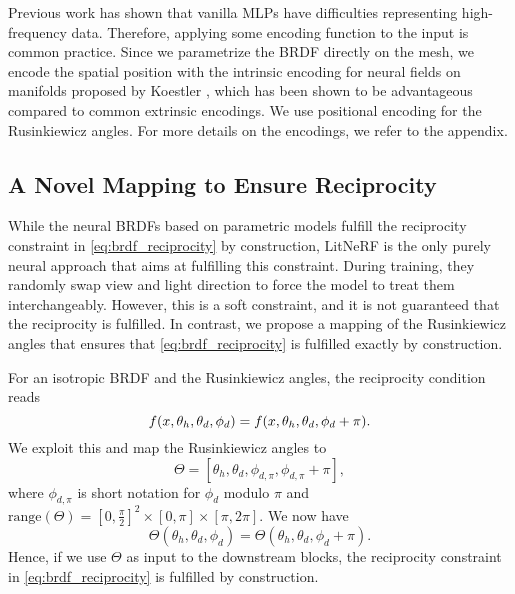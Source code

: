 Previous work has shown that vanilla MLPs have difficulties representing high-frequency data. Therefore, applying some encoding function to the input is common practice.
Since we parametrize the BRDF directly on the mesh, we encode the spatial position with the intrinsic encoding for neural fields on manifolds proposed by Koestler \etal \cite{KoestlerIntrinsicNeuralFields22}, which has been shown to be advantageous compared to common extrinsic encodings. We use positional encoding \cite{Mildenhall20Nerf} for the Rusinkiewicz angles. For more details on the encodings, we refer to the appendix.


\subsection{A Novel Mapping to Ensure Reciprocity}
\label{sec:reciMapping}
While the neural BRDFs based on parametric models fulfill the reciprocity constraint in \cref{eq:brdf_reciprocity} by construction, LitNeRF \cite{Sarkar23LitNerf} is the only purely neural approach that aims at fulfilling this constraint. During training, they randomly swap view and light direction to force the model to treat them interchangeably. However, this is a soft constraint, and it is not guaranteed that the reciprocity is fulfilled.
In contrast, we propose a mapping of the Rusinkiewicz angles that ensures that 
\cref{eq:brdf_reciprocity}
is fulfilled exactly by construction.

For an isotropic BRDF and the Rusinkiewicz angles, the reciprocity condition reads
\begin{equation}
    f(x,\theta_h,\theta_d,\phi_d) = f(x, \theta_h,\theta_d,\phi_d + \pi).
\end{equation}
We exploit this and map the Rusinkiewicz angles to
\begin{equation}
    \Theta = [\theta_h,\theta_d,\phi_{d,\pi},\phi_{d,\pi}+\pi], \label{eq:rusinkiewicz_reciprocity_mapping}
\end{equation}
where $\phi_{d,\pi}$ is short notation for $\phi_d$ modulo $\pi$ and $\text{range}(\Theta) = [0,\frac{\pi}{2}]^2\times\left[0, \pi\right]\times[\pi,2\pi]$. We now have
\begin{equation}
    \Theta(\theta_h,\theta_d,\phi_d) = \Theta(\theta_h,\theta_d,\phi_d + \pi).
\end{equation}
Hence, 
if we use $\Theta$ as input to the downstream blocks, the reciprocity constraint in \cref{eq:brdf_reciprocity} is fulfilled by construction.


